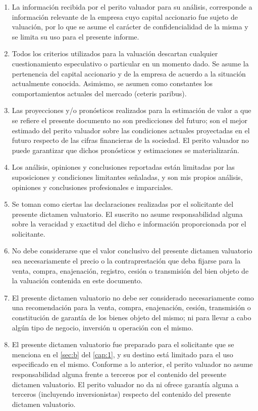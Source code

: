 \begin{enumerate}[\indent a)]
\item La informaci\'on recibida por el perito valuador para su an\'alisis, corresponde a informaci\'on relevante de la empresa cuyo capital accionario fue sujeto de valuaci\'on, por lo que se asume el car\'acter de confidencialidad de la misma y se limita su uso para el presente informe.
\item Todos los criterios utilizados para la valuaci\'on descartan cualquier cuestionamiento especulativo o particular en un momento dado. Se asume la pertenencia del capital accionario y de la empresa de acuerdo a la situaci\'on actualmente conocida. Asimismo, se asumen como constantes los comportamientos actuales del mercado (ceteris paribus).
\item Las proyecciones y/o pron\'osticos realizados para la estimaci\'on de valor a que se refiere el presente documento no son predicciones del futuro; son el mejor estimado del perito valuador sobre las condiciones actuales proyectadas en el futuro respecto de las cifras financieras de la sociedad. El perito valuador no puede garantizar que dichos pron\'osticos y estimaciones se materializar\'an.
\item Los an\'alisis, opiniones y conclusiones reportadas est\'an limitadas por las suposiciones y condiciones limitantes se\~naladas, y son mis propios an\'alisis, opiniones y conclusiones profesionales e imparciales.
\item Se toman como ciertas las declaraciones realizadas por el solicitante del presente dictamen valuatorio. El suscrito no asume responsabilidad alguna sobre la veracidad y exactitud del dicho e informaci\'on proporcionada por el solicitante.
\item No debe considerarse que el valor conclusivo del presente dictamen valuatorio sea necesariamente el precio o la contraprestaci\'on que deba fijarse para la venta, compra, enajenaci\'on, registro, cesi\'on o transmisi\'on del bien objeto de la valuaci\'on   contenida en este documento.
\item El presente dictamen valuatorio no debe ser considerado necesariamente como una recomendaci\'on para la venta, compra, enajenaci\'on, cesi\'on, transmisi\'on o constituci\'on de garant\'ia de los bienes objeto del mismo; ni para llevar a cabo alg\'un tipo de negocio, inversi\'on u operaci\'on con el mismo.
\item El presente dictamen valuatorio fue preparado para el solicitante que se menciona en el \autoref{sec:b} del \autoref{cap:1}, y su destino est\'a limitado para el uso especificado  en el mismo. Conforme a lo anterior, el perito valuador no asume responsabilidad alguna frente a terceros por el contenido del presente dictamen valuatorio. El perito valuador no da ni ofrece garant\'ia alguna a terceros (incluyendo inversionistas) respecto del contenido del presente dictamen valuatorio.

\end{enumerate}
